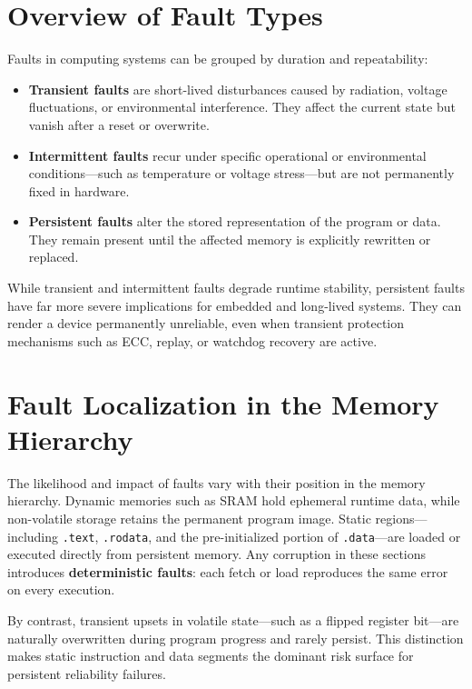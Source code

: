 \section{Overview of Fault Types}
\label{sec:fault-types}

Faults in computing systems can be grouped by duration and repeatability:

\begin{itemize}
  \item \textbf{Transient faults} are short-lived disturbances caused by radiation, voltage fluctuations, or environmental interference. They affect the current state but vanish after a reset or overwrite.
  \item \textbf{Intermittent faults} recur under specific operational or environmental conditions—such as temperature or voltage stress—but are not permanently fixed in hardware.
  \item \textbf{Persistent faults} alter the stored representation of the program or data. They remain present until the affected memory is explicitly rewritten or replaced.
\end{itemize}

While transient and intermittent faults degrade runtime stability, persistent faults have far more severe implications for embedded and long-lived systems. 
They can render a device permanently unreliable, even when transient protection mechanisms such as ECC, replay, or watchdog recovery are active.

\section{Fault Localization in the Memory Hierarchy}
\label{sec:fault-localization}

The likelihood and impact of faults vary with their position in the memory hierarchy. 
Dynamic memories such as SRAM hold ephemeral runtime data, while non-volatile storage retains the permanent program image. 
Static regions—including \texttt{.text}, \texttt{.rodata}, and the pre-initialized portion of \texttt{.data}—are loaded or executed directly from persistent memory. 
Any corruption in these sections introduces \textbf{deterministic faults}: each fetch or load reproduces the same error on every execution.

By contrast, transient upsets in volatile state—such as a flipped register bit—are naturally overwritten during program progress and rarely persist. 
This distinction makes static instruction and data segments the dominant risk surface for persistent reliability failures.

